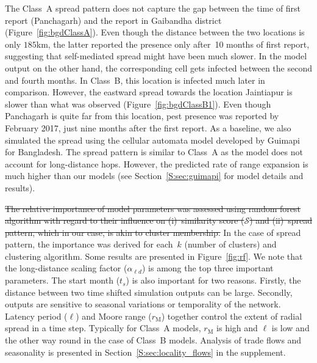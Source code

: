 \documentclass[11pt]{article}
\newcommand{\similarity}{\mathcal{S}}
\newcommand{\ald}{\alpha_{\ell d}}
\newcommand{\mooreRange}{r_\mathrm{M}}
\theoremstyle{definition}
\providecommand{\DIFdeltex}[1]{{\protect\color{red}\sout{#1}}}                      %
\providecommand{\DIFdelbegin}{} %
\providecommand{\DIFdelend}{} %
\providecommand{\DIFdel}[1]{\texorpdfstring{\DIFdeltex{#1}}{}} %
\newcommand{\DIFscaledelfig}{0.5}
\newlength{\DIFdelgraphicswidth} %
\newlength{\DIFdelgraphicsheight} %
\newcommand{\DIFdelincludegraphics}[2][]{%
\sbox{\DIFdelgraphicsbox}{\DIFOincludegraphics[#1]{#2}}%
\settoboxwidth{\DIFdelgraphicswidth}{\DIFdelgraphicsbox} %
\settoboxtotalheight{\DIFdelgraphicsheight}{\DIFdelgraphicsbox} %
\scalebox{\DIFscaledelfig}{%
\parbox[b]{\DIFdelgraphicswidth}{\usebox{\DIFdelgraphicsbox}\\[-\baselineskip] \rule{\DIFdelgraphicswidth}{0em}}\llap{\resizebox{\DIFdelgraphicswidth}{\DIFdelgraphicsheight}{%
\setlength{\unitlength}{\DIFdelgraphicswidth}%
\begin{picture}(1,1)%
\thicklines\linethickness{2pt} %
{\color[rgb]{1,0,0}\put(0,0){\framebox(1,1){}}}%
{\color[rgb]{1,0,0}\put(0,0){\line( 1,1){1}}}%
{\color[rgb]{1,0,0}\put(0,1){\line(1,-1){1}}}%
\end{picture}%
}\hspace*{3pt}}} %
} %
\DeclareRobustCommand{\DIFdelbegin}{\DIFOdelbegin \let\includegraphics\DIFdelincludegraphics} %
\DeclareRobustCommand{\DIFdelend}{\DIFOaddend \let\includegraphics\DIFOincludegraphics} %
\begin{document}
The Class~A spread pattern does not capture the gap between the time of first
report (Panchagarh) and the report in Gaibandha district
(Figure~\ref{fig:bgdClassA}). Even though the distance between the two
locations is only $185$km, the latter reported the presence only after~10
months of first report, suggesting that self-mediated spread might have been
much slower. In the model output on the other hand, the corresponding cell
gets infected between the second and fourth months.  In Class~B, this
location is infected much later in comparison. However, the eastward spread
towards the location Jaintiapur is slower than what was observed
(Figure~\ref{fig:bgdClassB1}). Even though Panchagarh is quite far from
this location, pest presence was reported by February 2017, just nine
months after the first report.  As a baseline, we also simulated the spread
using the cellular automata model developed by
Guimapi~\cite{guimapi2016modeling} for Bangladesh. The spread pattern is
similar to Class~A as the model does not account for long-distance hops.
However, the predicted rate of range expansion is much higher than our
models (see Section~\ref{S:sec:guimapi} for model details and results).

\DIFdelbegin \DIFdel{The relative importance of model parameters was assessed using random
forest algorithm with regard to their influence on (i)~similarity score
($\similarity$) and (ii)~spread pattern, which in our
case, is akin to cluster membership. }\DIFdelend In the case of spread pattern, the
importance was derived for each~$k$ (number of clusters) and clustering
algorithm. Some results are presented in Figure~\ref{fig:rf}. We note that
the long-distance scaling factor ($\ald$) is among the top three important
parameters. The start month ($t_s$) is also important for two reasons.
Firstly, the distance between two time shifted simulation outputs can be
large. Secondly, outputs are sensitive to seasonal variations or
temporality of the network.  Latency period ($\ell$) and Moore range
($\mooreRange$) together control the extent of radial spread in a time
step. Typically for Class~A models, $\mooreRange$ is high and $\ell$ is
low and the other way round in the case of Class~B models. Analysis of
trade flows and seasonality is presented in
Section~\ref{S:sec:locality_flows}
in the supplement.
\end{document}
